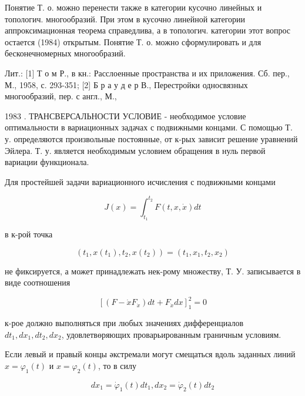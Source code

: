 \documentclass[10pt]{article}
\begin{document}
Понятие Т. о. можно перенести также в категории кусочно линейных и топологич. многообразий. При этом в кусочно линейной категории аппроксимационная теорема справедлива, а в топологич. категории этот вопрос остается (1984) открытым. Понятие Т. о. можно сформулировать и для бесконечномерных многообразий.



Лит.: [1] Т о м Р., в кн.: Расслоенные пространства и их приложения. Сб. пер., М., 1958, с. 293-351; [2] Б р а у д е р В., Перестройки односвязных многообразий, пер. с англ., М.,

1983 . ТРАНСВЕРСАЛЬНОСТИ УСЛОВИЕ - необходимое условие оптимальности в вариационных задачах с подвижными концами. С помощью Т. у. определяются произвольные постоянные, от к-рых зависит решение уравнений Эйлера. Т. у. является необходимым условием обращения в нуль первой вариации функционала.



Для простейшей задачи вариационного исчисления с подвижными концами



\[

J(x)=\int_{t_{1}}^{t_{2}} F(t, x, \dot{x}) d t

\]



в к-рой точка



\[

\left(t_{1}, x\left(t_{1}\right), t_{2}, x\left(t_{2}\right)\right)=\left(t_{1}, x_{1}, t_{2}, x_{2}\right)

\]



не фиксируется, а может принадлежать нек-рому множеству, Т. У. записывается в виде соотношения



\[

\left[\left(F-\dot{x} F_{\dot{x}}\right) d t+F_{\dot{x}} d x\right]_{1}^{2}=0

\]



к-рое должно выполняться при любых значениях дифференциалов $d t_{1}, d x_{1}, d t_{2}, d x_{2}$, удовлетвөряющих проварьированным граничным условиям.



Если левый и правый концы әкстремали могут смещаться вдоль заданных линий $x=\varphi_{1}(t)$ и $x=\varphi_{2}(t)$, то в силу



\[

d x_{1}=\dot{\varphi}_{1}(t) d t_{1}, d x_{2}=\dot{\varphi}_{2}(t) d t_{2}

\]
\end{document}
